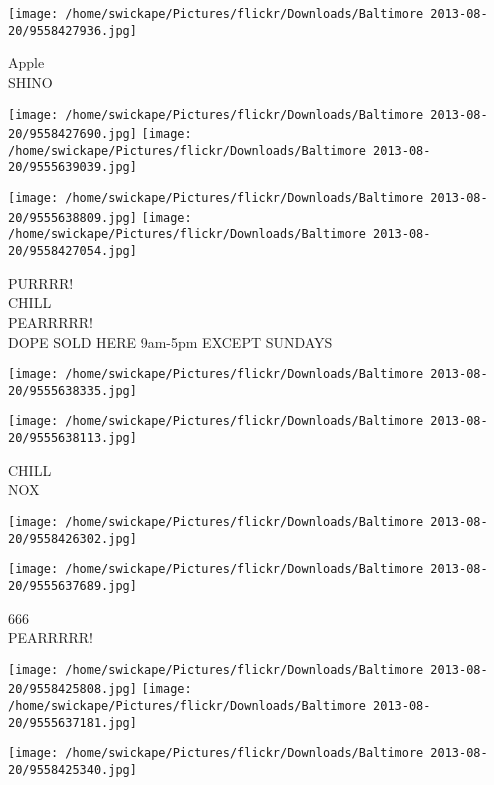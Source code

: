 \documentclass[10pt,letterpaper]{article}
\begin{document}
\vspace{0.25in}
\texttt{[image: /home/swickape/Pictures/flickr/Downloads/Baltimore 2013-08-20/9558427936.jpg]}

Apple\\
SHINO\\
\pagebreak

\texttt{[image: /home/swickape/Pictures/flickr/Downloads/Baltimore 2013-08-20/9558427690.jpg]}
\texttt{[image: /home/swickape/Pictures/flickr/Downloads/Baltimore 2013-08-20/9555639039.jpg]}

\texttt{[image: /home/swickape/Pictures/flickr/Downloads/Baltimore 2013-08-20/9555638809.jpg]}
\texttt{[image: /home/swickape/Pictures/flickr/Downloads/Baltimore 2013-08-20/9558427054.jpg]}

PURRRR!\\
CHILL\\
PEARRRRR!\\
DOPE SOLD HERE 9am{-}5pm EXCEPT SUNDAYS\\
\pagebreak

\texttt{[image: /home/swickape/Pictures/flickr/Downloads/Baltimore 2013-08-20/9555638335.jpg]}

\vspace{0.25in}
\texttt{[image: /home/swickape/Pictures/flickr/Downloads/Baltimore 2013-08-20/9555638113.jpg]}

CHILL\\
NOX\\
\pagebreak

\texttt{[image: /home/swickape/Pictures/flickr/Downloads/Baltimore 2013-08-20/9558426302.jpg]}

\vspace{0.25in}
\texttt{[image: /home/swickape/Pictures/flickr/Downloads/Baltimore 2013-08-20/9555637689.jpg]}

666\\
PEARRRRR!\\
\pagebreak

\texttt{[image: /home/swickape/Pictures/flickr/Downloads/Baltimore 2013-08-20/9558425808.jpg]}
\texttt{[image: /home/swickape/Pictures/flickr/Downloads/Baltimore 2013-08-20/9555637181.jpg]}

\vspace{0.25in}
\texttt{[image: /home/swickape/Pictures/flickr/Downloads/Baltimore 2013-08-20/9558425340.jpg]}
\end{document}
